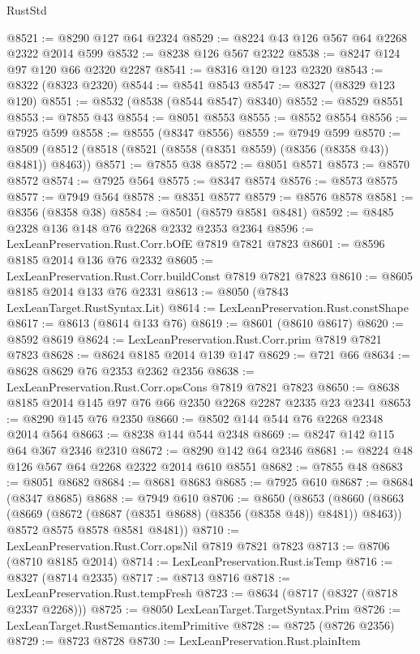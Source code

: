 \begin{lexlean}{RustStd}
\begin{coremodule}
{\begin{coremodule}
{{{{{{{{{{{{{{{{{{{{{{{{{{{{{{{{{{{{{{{{{{{{{{{{{{{{{{@8521 := @8290 @127 @64 @2324
@8529 := @8224 @43 @126 @567 @64 @2268 @2322 @2014 @599
@8532 := @8238 @126 @567 @2322
@8538 := @8247 @124 @97 @120 @66 @2320 @2287
@8541 := @8316 @120 @123 @2320
@8543 := @8322 (@8323 @2320)
@8544 := @8541 @8543
@8547 := @8327 (@8329 @123 @120)
@8551 := @8532 (@8538 (@8544 @8547) @8340)
@8552 := @8529 @8551
@8553 := @7855 @43
@8554 := @8051 @8553
@8555 := @8552 @8554
@8556 := @7925 @599
@8558 := @8555 (@8347 @8556)
@8559 := @7949 @599
@8570 := @8509 (@8512 (@8518 (@8521 (@8558 (@8351 @8559) (@8356 (@8358 @43)) @8481)) @8463))
@8571 := @7855 @38
@8572 := @8051 @8571
@8573 := @8570 @8572
@8574 := @7925 @564
@8575 := @8347 @8574
@8576 := @8573 @8575
@8577 := @7949 @564
@8578 := @8351 @8577
@8579 := @8576 @8578
@8581 := @8356 (@8358 @38)
@8584 := @8501 (@8579 @8581 @8481)
@8592 := @8485 @2328 @136 @148 @76 @2268 @2332 @2353 @2364
@8596 := LexLeanPreservation.Rust.Corr.bOfE @7819 @7821 @7823
@8601 := @8596 @8185 @2014 @136 @76 @2332
@8605 := LexLeanPreservation.Rust.Corr.buildConst @7819 @7821 @7823
@8610 := @8605 @8185 @2014 @133 @76 @2331
@8613 := @8050 (@7843 LexLeanTarget.RustSyntax.Lit)
@8614 := LexLeanPreservation.Rust.constShape
@8617 := @8613 (@8614 @133 @76)
@8619 := @8601 (@8610 @8617)
@8620 := @8592 @8619
@8624 := LexLeanPreservation.Rust.Corr.prim @7819 @7821 @7823
@8628 := @8624 @8185 @2014 @139 @147
@8629 := @721 @66
@8634 := @8628 @8629 @76 @2353 @2362 @2356
@8638 := LexLeanPreservation.Rust.Corr.opsCons @7819 @7821 @7823
@8650 := @8638 @8185 @2014 @145 @97 @76 @66 @2350 @2268 @2287 @2335 @23 @2341
@8653 := @8290 @145 @76 @2350
@8660 := @8502 @144 @544 @76 @2268 @2348 @2014 @564
@8663 := @8238 @144 @544 @2348
@8669 := @8247 @142 @115 @64 @367 @2346 @2310
@8672 := @8290 @142 @64 @2346
@8681 := @8224 @48 @126 @567 @64 @2268 @2322 @2014 @610 @8551
@8682 := @7855 @48
@8683 := @8051 @8682
@8684 := @8681 @8683
@8685 := @7925 @610
@8687 := @8684 (@8347 @8685)
@8688 := @7949 @610
@8706 := @8650
    (@8653
      (@8660
        (@8663 (@8669 (@8672 (@8687 (@8351 @8688) (@8356 (@8358 @48)) @8481)) @8463))
        @8572
        @8575
        @8578
        @8581
        @8481))
@8710 := LexLeanPreservation.Rust.Corr.opsNil @7819 @7821 @7823
@8713 := @8706 (@8710 @8185 @2014)
@8714 := LexLeanPreservation.Rust.isTemp
@8716 := @8327 (@8714 @2335)
@8717 := @8713 @8716
@8718 := LexLeanPreservation.Rust.tempFresh
@8723 := @8634 (@8717 (@8327 (@8718 @2337 @2268)))
@8725 := @8050 LexLeanTarget.TargetSyntax.Prim
@8726 := LexLeanTarget.RustSemantics.itemPrimitive
@8728 := @8725 (@8726 @2356)
@8729 := @8723 @8728
@8730 := LexLeanPreservation.Rust.plainItem
}}}}}}}}}}}}}}}}}}}}}}}}}}}}}}}}}}}}}}}}}}}}}}}}}}}}}}
\end{coremodule}}
\end{coremodule}
\end{lexlean}
